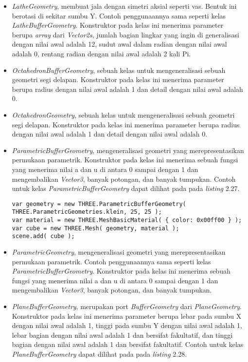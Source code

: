 \begin{itemize}
\begin{itemize}
	\item {\it LatheGeometry}, membuat jala dengan simetri aksial seperti vas. Bentuk ini berotasi di sekitar sumbu Y. Contoh penggunaannya sama seperti kelas {\it LatheBufferGeometry}. Konstruktor pada kelas ini menerima parameter berupa {\it array} dari {\it Vector2s}, jumlah bagian lingkar yang ingin di generalisasi dengan nilai awal adalah 12, sudut awal dalam radian dengan nilai awal adalah 0, rentang radian dengan nilai awal adalah 2 kali Pi.
	
	\item {\it OctahedronBufferGeometry}, sebuah kelas untuk mengeneralisasi sebuah geometri segi delapan. Konstruktor pada kelas ini menerima parameter berupa radius dengan nilai awal adalah 1 dan detail dengan nilai awal adalah 0.
	
	\item {\it OctahedronGeometry}, sebuah kelas untuk mengeneralisasi sebuah geometri segi delapan. Konstruktor pada kelas ini menerima parameter berupa radius dengan nilai awal adalah 1 dan detail dengan nilai awal adalah 0.
	
	\item {\it ParametricBufferGeometry}, mengeneralisasi geometri yang merepresentasikan permukaan parametrik. Konstruktor pada kelas ini menerima sebuah fungsi yang menerima nilai a dan u di antara 0 sampai dengan 1 dan mengembalikan {\it Vector3}, banyak potongan, dan banyak tumpukan. Contoh untuk kelas {\it ParametricBufferGeometry} dapat dilihat pada pada {\it listing} 2.27.
	
\begin{lstlisting}[caption={Contoh penggunaan kelas {\it ParametricBufferGeometry}.},captionpos=b]
var geometry = new THREE.ParametricBufferGeometry( 
THREE.ParametricGeometries.klein, 25, 25 );
var material = new THREE.MeshBasicMaterial( { color: 0x00ff00 } );
var cube = new THREE.Mesh( geometry, material );
scene.add( cube );
\end{lstlisting}

	\item {\it ParametricGeometry}, mengeneralisasi geometri yang merepresentasikan permukaan parametrik. Contoh penggunaannya sama seperti kelas {\it ParametricBufferGeometry}. Konstruktor pada kelas ini menerima sebuah fungsi yang menerima nilai a dan u di antara 0 sampai dengan 1 dan mengembalikan {\it Vector3}, banyak potongan, dan banyak tumpukan.
	
	\item {\it PlaneBufferGeometry}, merupakan port {\it BufferGeometry} dari {\it PlaneGeometry}. Konstruktor pada kelas ini menerima parameter berupa lebar pada sumbu X dengan nilai awal adalah 1, tinggi pada sumbu Y dengan nilai awal adalah 1, lebar bagian dengan nilai awal adalah 1 dan bersifat fakultatif, dan tinggi bagian dengan nilai awal adalah 1 dan bersifat fakultatif. Contoh untuk kelas {\it PlaneBufferGeometry} dapat dilihat pada pada {\it listing} 2.28.
	

\end{itemize}
\end{itemize}
